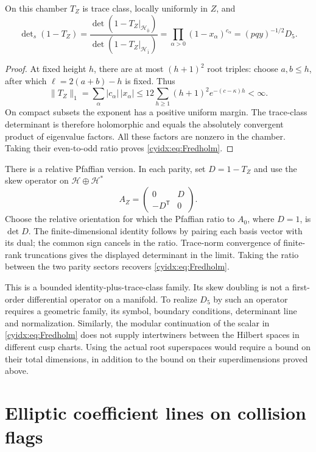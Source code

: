\begin{proposition}\label{cyidx:prop:Fredholm}
On this chamber \(T_Z\) is trace class, locally uniformly
in \(Z\), and
\begin{equation}\label{cyidx:eq:Fredholm}
 \det\nolimits_s(1-T_Z)
 =\frac{\det(1-T_Z|_{\mathcal H_{\bar0}})}
        {\det(1-T_Z|_{\mathcal H_{\bar1}})}
 =\prod_{\alpha>0}(1-x_\alpha)^{c_\alpha}
 =(pqy)^{-1/2}D_5.
\end{equation}
\end{proposition}
\begin{proof}
At fixed height \(h\), there are at most \((h+1)^2\)
root triples: choose \(a,b\leq h\), after which
\(\ell=2(a+b)-h\) is fixed. Thus
\[
 \|T_Z\|_1
 =\sum_\alpha |c_\alpha|\,|x_\alpha|
 \leq12\sum_{h\geq1}(h+1)^2e^{-(c-\kappa)h}<\infty.
\]
On compact subsets the exponent has a positive uniform
margin. The trace-class determinant is therefore
holomorphic and equals the absolutely convergent product
of eigenvalue factors. All these factors are nonzero
in the chamber. Taking their even-to-odd ratio proves
\eqref{cyidx:eq:Fredholm}.
\end{proof}

There is a relative Pfaffian version. In each parity,
set \(D=1-T_Z\) and use the skew operator on
\(\mathcal H\oplus\mathcal H^*\)
\[
 A_Z=\begin{pmatrix}0&D\\-D^{\mathsf T}&0\end{pmatrix}.
\]
Choose the relative orientation for which the Pfaffian
ratio to \(A_0\), where \(D=1\), is \(\det D\).
The finite-dimensional identity follows by pairing each
basis vector with its dual; the common sign cancels in
the ratio. Trace-norm convergence of finite-rank
truncations gives the displayed determinant in the limit.
Taking the ratio between the two parity sectors recovers
\eqref{cyidx:eq:Fredholm}.

This is a bounded identity-plus-trace-class family.
Its skew doubling is not a first-order differential
operator on a manifold. To realize \(D_5\) by such
an operator requires a geometric family, its symbol,
boundary conditions, determinant line and normalization.
Similarly, the modular continuation of the scalar in
\eqref{cyidx:eq:Fredholm} does not supply intertwiners
between the Hilbert spaces in different cusp charts.
Using the actual root superspaces would require a bound
on their total dimensions, in addition to the bound
on their superdimensions proved above.

\section{Elliptic coefficient lines on collision flags}
\label{cyidx:sec:Thom}

